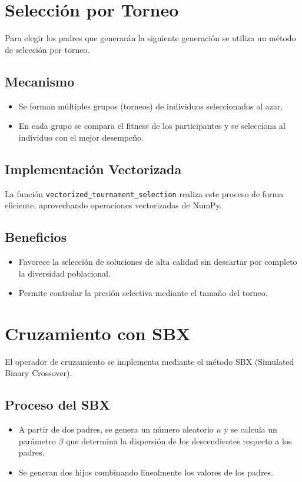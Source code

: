 \section{Selecci\'on por Torneo}

Para elegir los padres que generar\'an la siguiente generaci\'on se utiliza un m\'etodo de selecci\'on por torneo.

\subsection*{Mecanismo}
\begin{itemize}
    \item Se forman m\'ultiples grupos (torneos) de individuos seleccionados al azar.
    \item En cada grupo se compara el fitness de los participantes y se selecciona al individuo con el mejor desempe\~no.
\end{itemize}

\subsection*{Implementaci\'on Vectorizada}
La funci\'on \texttt{vectorized\_tournament\_selection} realiza este proceso de forma eficiente, aprovechando operaciones vectorizadas de NumPy.

\subsection*{Beneficios}
\begin{itemize}
    \item Favorece la selecci\'on de soluciones de alta calidad sin descartar por completo la diversidad poblacional.
    \item Permite controlar la presi\'on selectiva mediante el tama\~no del torneo.
\end{itemize}

\section{Cruzamiento con SBX}

El operador de cruzamiento se implementa mediante el m\'etodo SBX (Simulated Binary Crossover).

\subsection*{Proceso del SBX}
\begin{itemize}
    \item A partir de dos padres, se genera un n\'umero aleatorio $u$ y se calcula un par\'ametro $\beta$ que determina la dispersi\'on de los descendientes respecto a los padres.
    \item Se generan dos hijos combinando linealmente los valores de los padres.
\end{itemize}

